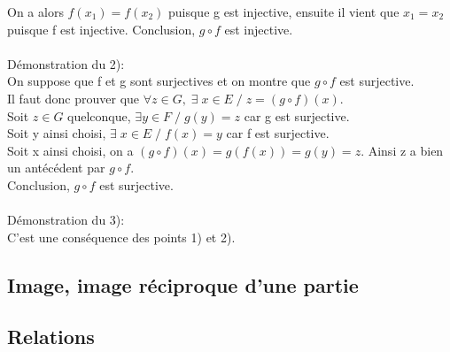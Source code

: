 \documentclass[a4paper,french,12pt]{article}
\begin{document}
On a alors $f(x_1)=f(x_2)$ puisque g est injective, ensuite il vient que $x_1=x_2$ puisque f est injective. Conclusion, $g\circ f$ est injective.\\
\\
Démonstration du 2):\\
On suppose que f et g sont surjectives et on montre que $g\circ f$ est surjective.\\
Il faut donc prouver que $\forall z\in G, \; \exists \; x\in E \; / \; z=(g\circ f)(x)$.\\
Soit $z\in G$ quelconque, $\exists y\in F \; / \; g(y)=z$ car g est surjective.\\
Soit y ainsi choisi, $\exists \; x\in E \; / \; f(x)=y$ car f est surjective.\\
Soit x ainsi choisi, on a $(g\circ f)(x)=g(f(x))=g(y)=z$. Ainsi z a bien un antécédent par $g\circ f$.\\
Conclusion, $g\circ f$ est surjective.\\
\\
Démonstration du 3):\\
C'est une conséquence des points 1) et 2).

\subsection{Image, image réciproque d'une partie}

\noindent
\textcolor{red}{
}

\subsection{Relations}
\end{document}
